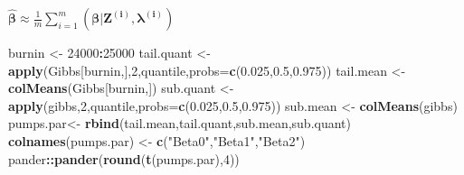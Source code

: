 \documentclass[
]{article}
\newenvironment{Shaded}{\begin{snugshade}}{\end{snugshade}}
\newcommand{\DataTypeTok}[1]{\textcolor[rgb]{0.13,0.29,0.53}{#1}}
\newcommand{\DecValTok}[1]{\textcolor[rgb]{0.00,0.00,0.81}{#1}}
\newcommand{\FloatTok}[1]{\textcolor[rgb]{0.00,0.00,0.81}{#1}}
\newcommand{\KeywordTok}[1]{\textcolor[rgb]{0.13,0.29,0.53}{\textbf{#1}}}
\newcommand{\NormalTok}[1]{#1}
\newcommand{\OperatorTok}[1]{\textcolor[rgb]{0.81,0.36,0.00}{\textbf{#1}}}
\newcommand{\StringTok}[1]{\textcolor[rgb]{0.31,0.60,0.02}{#1}}
\begin{document}
\(\boldsymbol{\hat\beta}\approx\frac1m\sum_{i=1}^m(\boldsymbol{\beta|Z^{(i)},\lambda^{(i)}})\)

\begin{Shaded}
\begin{Highlighting}[]
\NormalTok{burnin <-}\StringTok{ }\DecValTok{24000}\OperatorTok{:}\DecValTok{25000}
\NormalTok{tail.quant <-}\StringTok{ }\KeywordTok{apply}\NormalTok{(Gibbs[burnin,],}\DecValTok{2}\NormalTok{,quantile,}\DataTypeTok{probs=}\KeywordTok{c}\NormalTok{(}\FloatTok{0.025}\NormalTok{,}\FloatTok{0.5}\NormalTok{,}\FloatTok{0.975}\NormalTok{)) }
\NormalTok{tail.mean <-}\StringTok{ }\KeywordTok{colMeans}\NormalTok{(Gibbs[burnin,])}
\NormalTok{sub.quant <-}\StringTok{ }\KeywordTok{apply}\NormalTok{(gibbs,}\DecValTok{2}\NormalTok{,quantile,}\DataTypeTok{probs=}\KeywordTok{c}\NormalTok{(}\FloatTok{0.025}\NormalTok{,}\FloatTok{0.5}\NormalTok{,}\FloatTok{0.975}\NormalTok{)) }
\NormalTok{sub.mean <-}\StringTok{ }\KeywordTok{colMeans}\NormalTok{(gibbs)}
\NormalTok{pumps.par<-}\StringTok{ }\KeywordTok{rbind}\NormalTok{(tail.mean,tail.quant,sub.mean,sub.quant)}
\KeywordTok{colnames}\NormalTok{(pumps.par) <-}\StringTok{ }\KeywordTok{c}\NormalTok{(}\StringTok{"Beta0"}\NormalTok{,}\StringTok{"Beta1"}\NormalTok{,}\StringTok{"Beta2"}\NormalTok{)}
\NormalTok{pander}\OperatorTok{::}\KeywordTok{pander}\NormalTok{(}\KeywordTok{round}\NormalTok{(}\KeywordTok{t}\NormalTok{(pumps.par),}\DecValTok{4}\NormalTok{))}
\end{Highlighting}
\end{Shaded}
\end{document}
